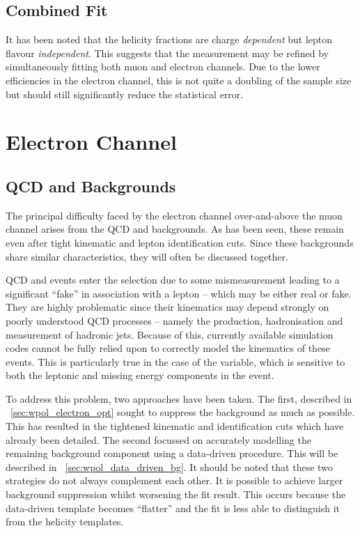 \subsection{Combined Fit}
It has been noted that the helicity fractions are charge \emph{dependent} but
lepton flavour \emph{independent}. This suggests that the measurement may be
refined by simultaneously fitting both muon and electron channels. Due to the
lower efficiencies in the electron channel, this is not quite a doubling of the
sample size but should still significantly reduce the statistical error.

\section{Electron Channel}
\subsection{\ac{QCD} and \gammajets Backgrounds}
The principal difficulty faced by the electron channel over-and-above the muon
channel arises from the \ac{QCD} and \gammajets backgrounds. As has been seen,
these remain even after tight kinematic and lepton identification cuts. Since
these backgrounds share similar characteristics, they will often be discussed
together.

\ac{QCD} and \gammajets events enter the selection due to some mismeasurement
leading to a significant ``fake'' \PtW in association with a lepton -- which may
be either real or fake. They are highly problematic since their kinematics may
depend strongly on poorly understood \ac{QCD} processes -- namely the
production, hadronisation and measurement of hadronic jets. Because of this,
currently available simulation codes cannot be fully relied upon to correctly
model the kinematics of these events. This is particularly true in the case of
the \LP variable, which is sensitive to both the leptonic and missing energy
components in the event.

To address this problem, two approaches have been taken. The first, described in
\sec~\ref{sec:wpol_electron_opt} sought to suppress the background as much as
possible. This has resulted in the tightened kinematic and identification cuts
which have already been detailed. The second focussed on accurately modelling
the remaining background component using a data-driven procedure. This will be
described in \sec~\ref{sec:wpol_data_driven_bg}. It should be noted that these
two strategies do not always complement each other. It is possible to achieve
larger background suppression whilst worsening the fit result. This occurs
because the data-driven template becomes ``flatter'' and the fit is less able to
distinguish it from the helicity templates.

